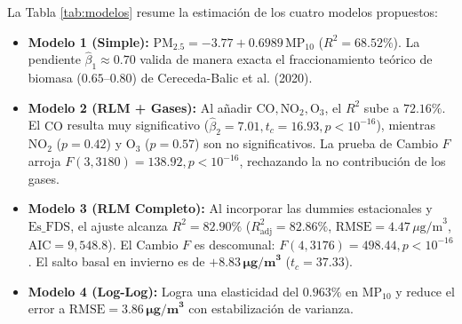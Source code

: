 \documentclass[10pt,twocolumn,a4paper]{article}
\begin{document}
La Tabla \ref{tab:modelos} resume la estimación de los cuatro modelos propuestos:
\begin{itemize}
    \item \textbf{Modelo 1 (Simple):} $\text{PM}_{2.5} = -3.77 + 0.6989\,\text{MP}_{10}$ ($R^2 = 68.52\%$). La pendiente $\hat{\beta}_1 \approx 0.70$ valida de manera exacta el fraccionamiento teórico de biomasa ($0.65\text{--}0.80$) de Cereceda-Balic et al. (2020).
    \item \textbf{Modelo 2 (RLM + Gases):} Al añadir $\text{CO}, \text{NO}_2, \text{O}_3$, el $R^2$ sube a $72.16\%$. El $\text{CO}$ resulta muy significativo ($\hat{\beta}_2 = 7.01, t_c = 16.93, p < 10^{-16}$), mientras $\text{NO}_2$ ($p=0.42$) y $\text{O}_3$ ($p=0.57$) son no significativos. La prueba de Cambio $F$ arroja $F(3, 3180) = 138.92, p < 10^{-16}$, rechazando la no contribución de los gases.
    \item \textbf{Modelo 3 (RLM Completo):} Al incorporar las dummies estacionales y $\text{Es\_FDS}$, el ajuste alcanza $R^2 = \mathbf{82.90\%}$ ($R^2_{\text{adj}} = 82.86\%$, $\text{RMSE} = 4.47\,\mu\text{g/m}^3$, $\text{AIC} = 9,548.8$). El Cambio $F$ es descomunal: $F(4, 3176) = 498.44, p < 10^{-16}$. El salto basal en invierno es de $\mathbf{+8.83\,\mu\text{g/m}^3}$ ($t_c = 37.33$).
    \item \textbf{Modelo 4 (Log-Log):} Logra una elasticidad del $0.963\%$ en $\text{MP}_{10}$ y reduce el error a $\text{RMSE} = \mathbf{3.86\,\mu\text{g/m}^3}$ con estabilización de varianza.
\end{itemize}
\end{document}
